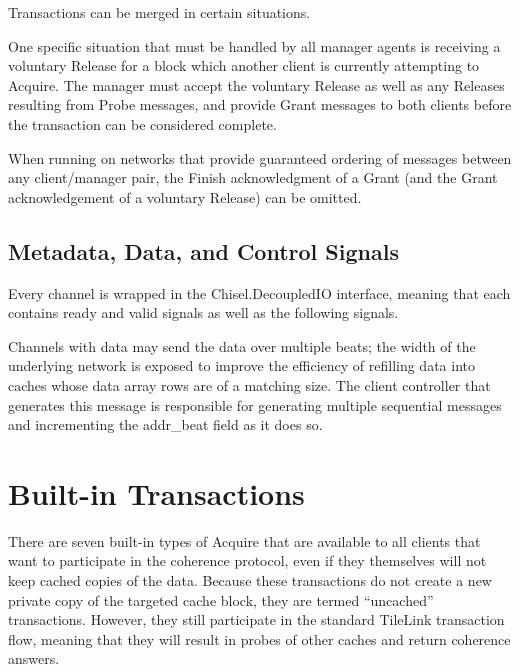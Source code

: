 Transactions can be merged in certain situations. 

One specific situation that must be handled by all manager agents is receiving a voluntary Release for a block which another client is currently attempting to Acquire.
The manager must accept the voluntary Release as well as any Releases resulting from Probe messages, and provide Grant messages to both clients before the transaction can be considered complete.

When running on networks that provide guaranteed ordering of messages between any client/manager pair, the Finish acknowledgment of a Grant (and the Grant acknowledgement of a voluntary Release) can be omitted.

\subsection{Metadata, Data, and Control Signals}

Every channel is wrapped in the Chisel.DecoupledIO interface, meaning that each contains ready and valid signals as well as the following signals.

Channels with data may send the data over multiple beats; the width of the underlying network is exposed to improve the efficiency of refilling data into caches whose data array rows are of a matching size.
The client controller that generates this message is responsible for generating multiple sequential messages and incrementing the addr\_beat field as it does so.

\section{Built-in Transactions}

There are seven built-in types of Acquire that are available to all clients that want to participate in the coherence protocol, even if they themselves will not keep cached copies of the data.
Because these transactions do not create a new private copy of the targeted cache block, they are termed ``uncached'' transactions. 
However, they still participate in the standard TileLink transaction flow, meaning that they will result in probes of other caches and return coherence answers.

